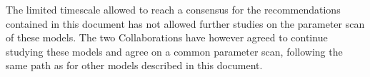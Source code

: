 The limited timescale allowed to reach a consensus for
the recommendations contained in this document has not allowed further studies on the 
parameter scan of these models. The two Collaborations have however agreed to continue studying
these models and agree on a common parameter scan,
following the same path as for other models described in this document.  

%
%
%
%
%
